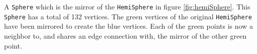 \label{fig:fullSphere} A \verb|Sphere| which is the mirror of the \verb|HemiSphere| in figure \ref{fig:hemiSphere}. This \verb|Sphere| has a total of 132 vertices. The green vertices of the original \verb|HemiSphere| have been mirrored to create the blue vertices. Each of the green points is now a neighbor to, and shares an edge connection with, the mirror of the other green point.